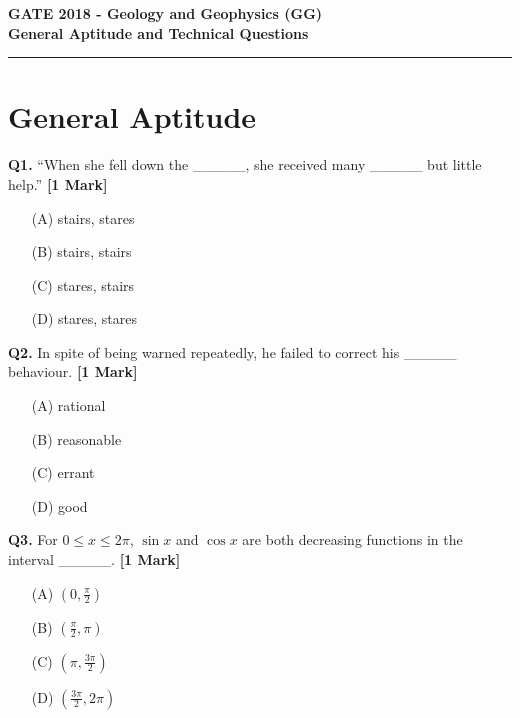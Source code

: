\documentclass[11pt]{article}
\newcommand{\questiona}[2]{
    \noindent\textbf{Q#2.} #1 \hfill \textbf{[1 Mark]}
}
\begin{document}
\begin{center}
    \Large\textbf{GATE 2018 - Geology and Geophysics (GG)} \\
    \large\textbf{General Aptitude and Technical Questions} \\
    \rule{\textwidth}{0.5pt} %
\end{center}

\vspace{0.5cm}

\section*{General Aptitude}

\questiona{“When she fell down the \_\_\_\_\_, she received many \_\_\_\_\_ but little help.”}{1}
\begin{enumerate}
    \item[(A)] stairs, stares
    \item[(B)] stairs, stairs
    \item[(C)] stares, stairs
    \item[(D)] stares, stares
\end{enumerate}
\vspace{0.5cm}

\questiona{In spite of being warned repeatedly, he failed to correct his \_\_\_\_\_ behaviour.}{2}
\begin{enumerate}
    \item[(A)] rational
    \item[(B)] reasonable
    \item[(C)] errant
    \item[(D)] good
\end{enumerate}
\vspace{0.5cm}

\questiona{For \( 0 \leq x \leq 2\pi \), \(\sin x\) and \(\cos x\) are both decreasing functions in the interval \_\_\_\_\_.}{3}
\begin{enumerate}
    \item[(A)] \( \left(0, \frac{\pi}{2} \right) \)
    \item[(B)] \( \left( \frac{\pi}{2}, \pi \right) \)
    \item[(C)] \( \left( \pi, \frac{3\pi}{2} \right) \)
    \item[(D)] \( \left( \frac{3\pi}{2}, 2\pi \right) \)
\end{enumerate}
\vspace{0.5cm}
\end{document}

